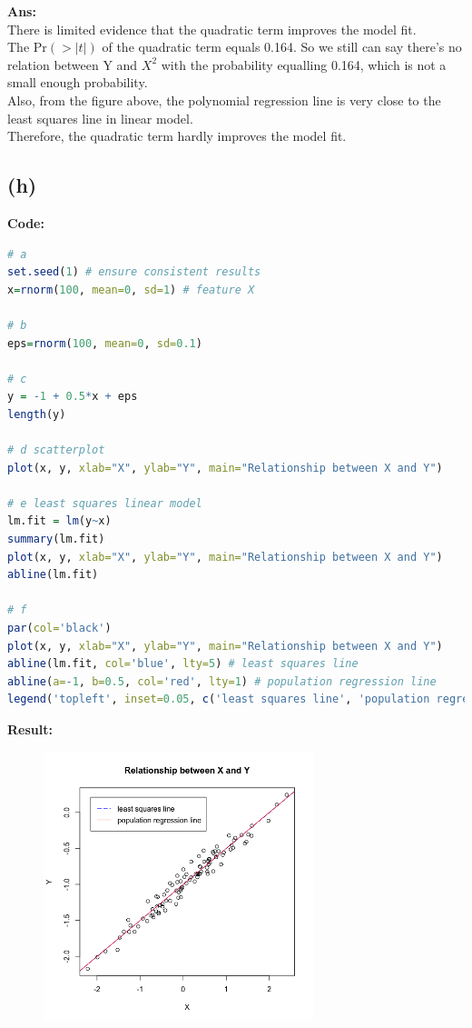 \documentclass[twoside]{homework}
\begin{document}
\textbf{Ans:}\\
There is limited evidence that the quadratic term improves the model fit. \\
The $\mathrm{Pr}(>|t|)$ of the quadratic term equals 0.164. So we still can say there's no relation between Y and $X^2$ with the probability equalling 0.164, which is not a small enough probability. \\
Also, from the figure above, the polynomial regression line is very close to the least squares line in linear model. \\
Therefore, the quadratic term hardly improves the model fit.

\subsection*{(h)}
\textbf{Code:}
\begin{lstlisting}[language=R]
# a
set.seed(1) # ensure consistent results
x=rnorm(100, mean=0, sd=1) # feature X

# b
eps=rnorm(100, mean=0, sd=0.1)

# c
y = -1 + 0.5*x + eps
length(y)

# d scatterplot
plot(x, y, xlab="X", ylab="Y", main="Relationship between X and Y")

# e least squares linear model
lm.fit = lm(y~x)
summary(lm.fit)
plot(x, y, xlab="X", ylab="Y", main="Relationship between X and Y")
abline(lm.fit)

# f 
par(col='black')
plot(x, y, xlab="X", ylab="Y", main="Relationship between X and Y")
abline(lm.fit, col='blue', lty=5) # least squares line
abline(a=-1, b=0.5, col='red', lty=1) # population regression line
legend('topleft', inset=0.05, c('least squares line', 'population regression line'), lty=c(5, 1), col=c('blue', 'red'), bty = "o")
\end{lstlisting}
\textbf{Result:}
\begin{figure}[htb]
\begin{center}
\includegraphics[width=0.7\textwidth]{HW1_P3_h.png}
\end{center}
\label{fig:HW1_P3_h}
\end{figure}
\end{document}
